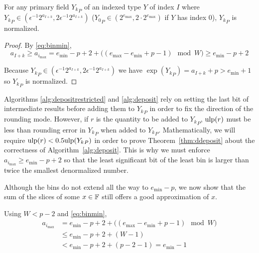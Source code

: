       \begin{samepage}
      \begin{thm}
        For any primary field ${Y_k}_P$ of an indexed type $Y$ of index $I$ where ${Y_k}_P \in (\epsilon^{-1} 2^{a_{I + k}}, 2 \epsilon^{-1} 2^{a_{I + k}})$ (${Y_0}_P \in (2^{e_{\max}}, 2 \cdot 2^{e_{\max}})$ if $Y$ has index 0), ${Y_k}_P$ is normalized.
        \label{thm:underflowufp}
      \end{thm}
      \end{samepage}

      \begin{proof}
        By \eqref{eq:binmin},
        \[
        a_{I + k} \geq a_{i_{\max}} = e_{\min} - p + 2 + \bigl((e_{\max} - e_{\min} + p - 1) \mod W\bigr) \geq e_{\min} - p + 2
        \]

        Because ${Y_k}_P \in (\epsilon^{-1} 2^{a_{I + k}}, 2 \epsilon^{-1} 2^{a_{I + k}})$ we have $\exp({Y_k}_P) = a_{I + k} + p > e_{\min} + 1$ so ${Y_k}_P$ is normalized.
      \end{proof}

      Algorithms \ref{alg:depositrestricted} and \ref{alg:deposit} rely on
      setting the last bit of intermediate results before adding them to
      ${Y_k}_P$ in order to fix the direction of the rounding mode. However, if
      $r$ is the quantity to be added to ${Y_k}_P$, $\text{ulp}(r)$ must be less than
      rounding error in ${Y_k}_P$ when added to ${Y_k}_P$.
      Mathematically, we will require $\text{ulp}(r) < 0.5\text{ulp}({Y_k}_P)$ in order to
      prove Theorem~\ref{thm:ddeposit} about the correctness of
      Algorithm~\ref{alg:deposit}.  This is why we must enforce $a_{i_{\max}}
      \geq e_{\min} - p + 2$ so that the least significant bit of the least bin
      is larger than twice the smallest denormalized number.

      Although the bins do not extend all the way to $e_{\min} - p$, we now
      show that the sum of the slices of some $x \in \mathbb{F}$ still offers a good
      approximation of $x$.

      Using $W < p - 2$ and \eqref{eq:binmin},
      \begin{align*}
        a_{i_{\max}} & = e_{\min} - p + 2 + \bigl((e_{\max} - e_{\min} + p - 1 ) \mod W \bigr) \\
            & \leq e_{\min} - p + 2 + (W - 1) \\
            & < e_{\min} - p + 2 + (p - 2 - 1) =  e_{\min} - 1 
      \end{align*}

